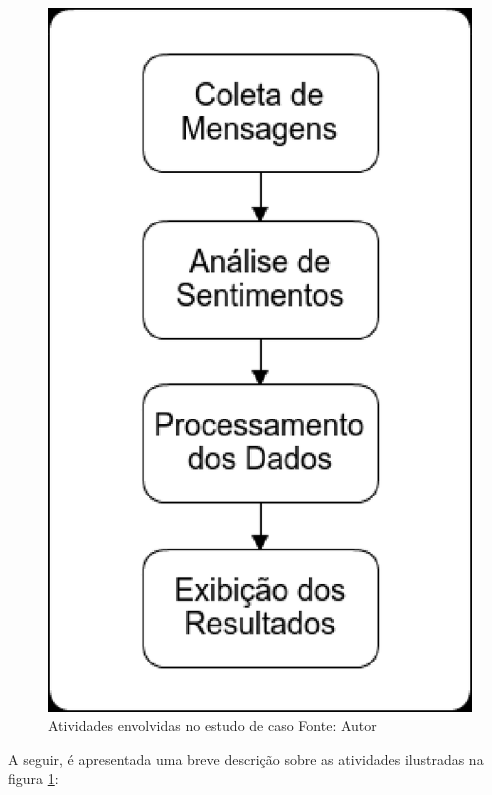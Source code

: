 \begin{figure}[ht!]
	\centering
	\includegraphics[keepaspectratio=true,scale=0.5]
	  {figuras/atividades.eps}
	\caption[Atividades envolvidas no estudo de caso]{Atividades envolvidas no estudo de caso
	\protect\linebreak Fonte: Autor}
	\label{fig-atividades}
\end{figure}
\FloatBarrier

A seguir, é apresentada uma breve descrição sobre as atividades ilustradas na figura \ref{fig-atividades}:

